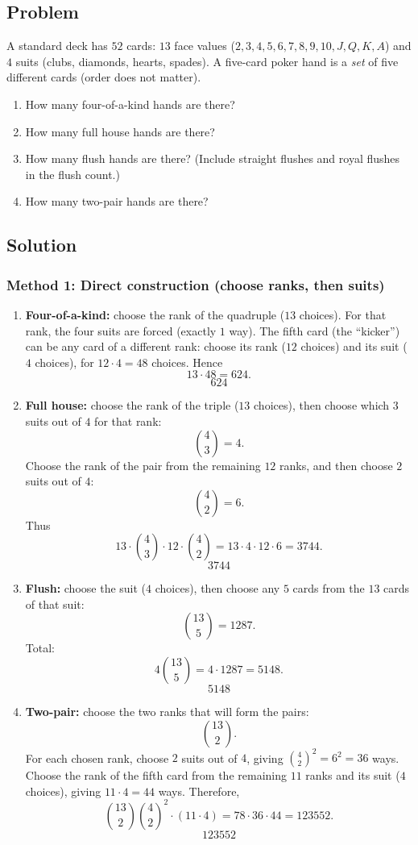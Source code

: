 \documentclass[12pt]{article}
\begin{document}
\subsection{Problem}
A standard deck has $52$ cards: $13$ face values ($2,3,4,5,6,7,8,9,10,J,Q,K,A$) and $4$ suits (clubs, diamonds, hearts, spades).
A five-card poker hand is a \emph{set} of five different cards (order does not matter).
\begin{enumerate}[label=(\alph*)]
\item How many four-of-a-kind hands are there?
\item How many full house hands are there?
\item How many flush hands are there? (Include straight flushes and royal flushes in the flush count.)
\item How many two-pair hands are there?
\end{enumerate}

\subsection{Solution}

\subsubsection{Method 1: Direct construction (choose ranks, then suits)}
\begin{enumerate}[label=(\alph*)]
\item \textbf{Four-of-a-kind:} choose the rank of the quadruple ($13$ choices). For that rank, the four suits are forced (exactly $1$ way). The fifth card (the ``kicker'') can be any card of a different rank: choose its rank ($12$ choices) and its suit ($4$ choices), for $12\cdot 4=48$ choices. Hence
\[
13\cdot 48=624.
\]
\[
\boxed{624}
\]

\item \textbf{Full house:} choose the rank of the triple ($13$ choices), then choose which $3$ suits out of $4$ for that rank:
\[
\binom{4}{3}=4.
\]
Choose the rank of the pair from the remaining $12$ ranks, and then choose $2$ suits out of $4$:
\[
\binom{4}{2}=6.
\]
Thus
\[
13\cdot \binom{4}{3}\cdot 12\cdot \binom{4}{2}
=13\cdot 4\cdot 12\cdot 6
=3744.
\]
\[
\boxed{3744}
\]

\item \textbf{Flush:} choose the suit ($4$ choices), then choose any $5$ cards from the $13$ cards of that suit:
\[
\binom{13}{5}=1287.
\]
Total:
\[
4\binom{13}{5}=4\cdot 1287=5148.
\]
\[
\boxed{5148}
\]

\item \textbf{Two-pair:} choose the two ranks that will form the pairs:
\[
\binom{13}{2}.
\]
For each chosen rank, choose $2$ suits out of $4$, giving $\binom{4}{2}^2=6^2=36$ ways.
Choose the rank of the fifth card from the remaining $11$ ranks and its suit ($4$ choices), giving $11\cdot 4=44$ ways.
Therefore,
\[
\binom{13}{2}\binom{4}{2}^2\cdot (11\cdot 4)
=78\cdot 36\cdot 44
=123552.
\]
\[
\boxed{123552}
\]
\end{enumerate}
\end{document}
